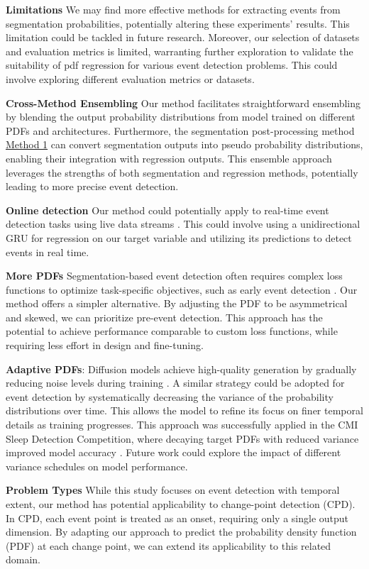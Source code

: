 \documentclass{article}
\begin{document}
\textbf{Limitations} We may find more effective methods for extracting events from segmentation probabilities, potentially altering these experiments’ results. This limitation could be tackled in future research. Moreover, our selection of datasets and evaluation metrics is limited, warranting further exploration to validate the suitability of pdf regression for various event detection problems. This could involve exploring different evaluation metrics or datasets.

\textbf{Cross-Method Ensembling} Our method facilitates straightforward ensembling by blending the output probability distributions from model trained on different PDFs and architectures. Furthermore, the segmentation post-processing method \hyperref[seg:m1]{Method 1} can convert segmentation outputs into pseudo probability distributions, enabling their integration with regression outputs. This ensemble approach leverages the strengths of both segmentation and regression methods, potentially leading to more precise event detection.

\textbf{Online detection} Our method could potentially apply to real-time event detection tasks using live data streams \citep{aminikhanghahi2017}. This could involve using a unidirectional GRU for regression on our target variable and utilizing its predictions to detect events in real time.

\textbf{More PDFs} Segmentation-based event detection often requires complex loss functions to optimize task-specific objectives, such as early event detection \citep{phan2018}. Our method offers a simpler alternative. By adjusting the PDF to be asymmetrical and skewed, we can prioritize pre-event detection. This approach has the potential to achieve performance comparable to custom loss functions, while requiring less effort in design and fine-tuning.

\textbf{Adaptive PDFs}: Diffusion models achieve high-quality generation by gradually reducing noise levels during training \citep{ho2020}. A similar strategy could be adopted for event detection by systematically decreasing the variance of the probability distributions over time. This allows the model to refine its focus on finer temporal details as training progresses. This approach was successfully applied in the CMI Sleep Detection Competition, where decaying target PDFs with reduced variance improved model accuracy \citep{esper2023}. Future work could explore the impact of different variance schedules on model performance.

\textbf{Problem Types} While this study focuses on event detection with temporal extent, our method has potential applicability to change-point detection (CPD). In CPD, each event point is treated as an onset, requiring only a single output dimension. By adapting our approach to predict the probability density function (PDF) at each change point, we can extend its applicability to this related domain.
\end{document}
